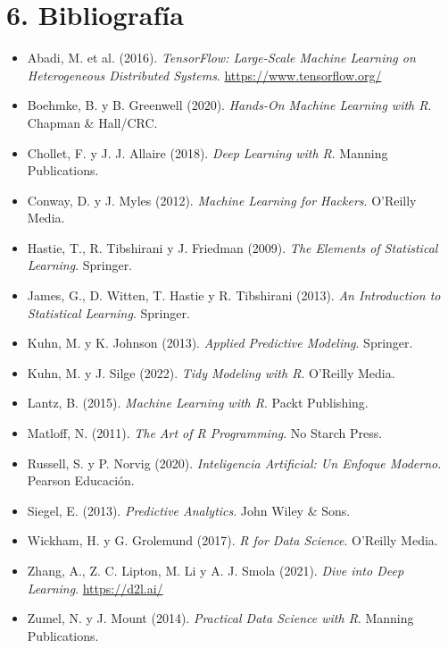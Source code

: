 \documentclass[11pt]{article}
\begin{document}
\section*{6. Bibliografía}

\begin{itemize}[leftmargin=*, itemsep=3pt]
  \item Abadi, M. et al. (2016). \textit{TensorFlow: Large-Scale Machine Learning on Heterogeneous Distributed Systems}. \url{https://www.tensorflow.org/}
  \item Boehmke, B. y B. Greenwell (2020). \textit{Hands-On Machine Learning with R}. Chapman \& Hall/CRC.
  \item Chollet, F. y J. J. Allaire (2018). \textit{Deep Learning with R}. Manning Publications.
  \item Conway, D. y J. Myles (2012). \textit{Machine Learning for Hackers}. O'Reilly Media.
  \item Hastie, T., R. Tibshirani y J. Friedman (2009). \textit{The Elements of Statistical Learning}. Springer.
  \item James, G., D. Witten, T. Hastie y R. Tibshirani (2013). \textit{An Introduction to Statistical Learning}. Springer.
  \item Kuhn, M. y K. Johnson (2013). \textit{Applied Predictive Modeling}. Springer.
  \item Kuhn, M. y J. Silge (2022). \textit{Tidy Modeling with R}. O'Reilly Media.
  \item Lantz, B. (2015). \textit{Machine Learning with R}. Packt Publishing.
  \item Matloff, N. (2011). \textit{The Art of R Programming}. No Starch Press.
  \item Russell, S. y P. Norvig (2020). \textit{Inteligencia Artificial: Un Enfoque Moderno}. Pearson Educación.
  \item Siegel, E. (2013). \textit{Predictive Analytics}. John Wiley \& Sons.
  \item Wickham, H. y G. Grolemund (2017). \textit{R for Data Science}. O'Reilly Media.
  \item Zhang, A., Z. C. Lipton, M. Li y A. J. Smola (2021). \textit{Dive into Deep Learning}. \url{https://d2l.ai/}
  \item Zumel, N. y J. Mount (2014). \textit{Practical Data Science with R}. Manning Publications.
\end{itemize}
\end{document}
